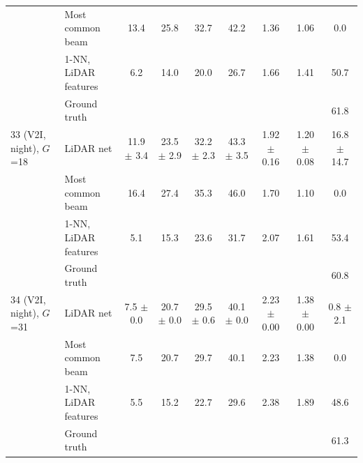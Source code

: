 \begin{table}[t]
{\begin{tabular}{@{}llccccccc@{}}
 & Most common beam & 13.4 & 25.8 & 32.7 & 42.2 & 1.36 & 1.06 & 0.0 \\
 & 1-NN, LiDAR features & 6.2 & 14.0 & 20.0 & 26.7 & 1.66 & 1.41 & 50.7 \\
 & Ground truth & \multicolumn{6}{c}{} & 61.8 \\
\midrule
33 (V2I, night), $G$=18 & LiDAR net & 11.9 $\pm$ 3.4 & 23.5 $\pm$ 2.9 & 32.2 $\pm$ 2.3 & 43.3 $\pm$ 3.5 & 1.92 $\pm$ 0.16 & 1.20 $\pm$ 0.08 & 16.8 $\pm$ 14.7 \\
 & Most common beam & 16.4 & 27.4 & 35.3 & 46.0 & 1.70 & 1.10 & 0.0 \\
 & 1-NN, LiDAR features & 5.1 & 15.3 & 23.6 & 31.7 & 2.07 & 1.61 & 53.4 \\
 & Ground truth & \multicolumn{6}{c}{} & 60.8 \\
\midrule
34 (V2I, night), $G$=31 & LiDAR net & 7.5 $\pm$ 0.0 & 20.7 $\pm$ 0.0 & 29.5 $\pm$ 0.6 & 40.1 $\pm$ 0.0 & 2.23 $\pm$ 0.00 & 1.38 $\pm$ 0.00 & 0.8 $\pm$ 2.1 \\
 & Most common beam & 7.5 & 20.7 & 29.7 & 40.1 & 2.23 & 1.38 & 0.0 \\
 & 1-NN, LiDAR features & 5.5 & 15.2 & 22.7 & 29.6 & 2.38 & 1.89 & 48.6 \\
 & Ground truth & \multicolumn{6}{c}{} & 61.3 \\
\bottomrule\end{tabular}}\end{table}

